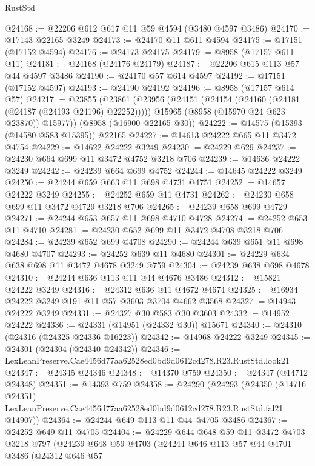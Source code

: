 \begin{lexlean}{RustStd}
\begin{coremodule}
@24168 := @22206 @612 @617 @11 @59 @4594 (@3480 @4597 @3486)
@24170 := @17143 @22165 @3249
@24173 := @24170 @11 @611 @4594
@24175 := @17151 (@17152 @4594)
@24176 := @24173 @24175
@24179 := @8958 (@17157 @611 @11)
@24181 := @24168 (@24176 @24179)
@24187 := @22206 @615 @113 @57 @44 @4597 @3486
@24190 := @24170 @57 @614 @4597
@24192 := @17151 (@17152 @4597)
@24193 := @24190 @24192
@24196 := @8958 (@17157 @614 @57)
@24217 := @23855
    (@23861
      (@23956
        (@24151 (@24154 (@24160 (@24181 (@24187 (@24193 @24196) @22252)))))
        @15965
        (@8958 (@15970 @24 @623 @23870))
        @15977))
    (@8958 (@16900 @22165 @30))
@24222 := @14575 (@15393 (@14580 @583 @15395)) @22165
@24227 := @14613 @24222 @665 @11 @3472 @4754
@24229 := @14622 @24222 @3249
@24230 := @24229 @629
@24237 := @24230 @664 @699 @11 @3472 @4752 @3218 @706
@24239 := @14636 @24222 @3249
@24242 := @24239 @664 @699 @4752
@24244 := @14645 @24222 @3249
@24250 := @24244 @659 @663 @11 @698 @4731 @4751
@24252 := @14657 @24222 @3249
@24255 := @24252 @659 @11 @4731
@24262 := @24230 @658 @699 @11 @3472 @4729 @3218 @706
@24265 := @24239 @658 @699 @4729
@24271 := @24244 @653 @657 @11 @698 @4710 @4728
@24274 := @24252 @653 @11 @4710
@24281 := @24230 @652 @699 @11 @3472 @4708 @3218 @706
@24284 := @24239 @652 @699 @4708
@24290 := @24244 @639 @651 @11 @698 @4680 @4707
@24293 := @24252 @639 @11 @4680
@24301 := @24229 @634 @638 @698 @11 @3472 @4678 @3249 @759
@24304 := @24239 @638 @698 @4678
@24310 := @24244 @636 @113 @11 @44 @4676 @3486
@24312 := @15821 @24222 @3249
@24316 := @24312 @636 @11 @4672 @4674
@24325 := @16934 @24222 @3249 @191 @11 @57 @3603 @3704 @4662 @3568
@24327 := @14943 @24222 @3249
@24331 := @24327 @30 @583 @30 @3603
@24332 := @14952 @24222
@24336 := @24331 (@14951 (@24332 @30)) @15671
@24340 := @24310 (@24316 (@24325 @24336 @16223))
@24342 := @14968 @24222 @3249
@24345 := @24301 (@24304 (@24340 @24342))
@24346 := LexLeanPreserve.Cae4456d77aa62528ed0bd9d0612cd278.R23.RustStd.look21
@24347 := @24345 @24346
@24348 := @14370 @759
@24350 := @24347 (@14712 @24348)
@24351 := @14393 @759
@24358 := @24290
    (@24293
      (@24350
        (@14716 @24351)
        LexLeanPreserve.Cae4456d77aa62528ed0bd9d0612cd278.R23.RustStd.fal21
        @14907))
@24364 := @24244 @649 @113 @11 @44 @4705 @3486
@24367 := @24252 @649 @11 @4705
@24404 := @24229
    @644
    @648
    @59
    @11
    @3472
    @4703
    @3218
    @797
    (@24239
      @648
      @59
      @4703
      (@24244
        @646
        @113
        @57
        @44
        @4701
        @3486
        (@24312
          @646
          @57

\end{coremodule}
\end{lexlean}

